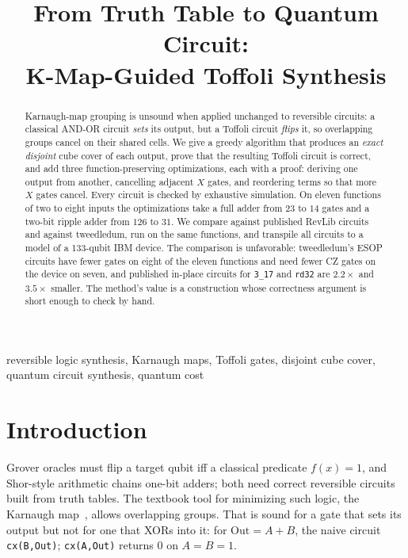 \documentclass[conference]{IEEEtran}
\newcommand{\code}[1]{\texttt{#1}}
\theoremstyle{plain}
\begin{document}
\title{From Truth Table to Quantum Circuit:\\K-Map-Guided Toffoli Synthesis}
\author{
}

\maketitle

\begin{abstract}
Karnaugh-map grouping is unsound when applied unchanged to reversible
circuits: a classical AND-OR circuit \emph{sets} its output, but a
Toffoli circuit \emph{flips} it, so overlapping groups cancel on their
shared cells. We give a greedy algorithm that produces an \emph{exact
disjoint} cube cover of each output, prove that the resulting Toffoli
circuit is correct, and add three function-preserving optimizations,
each with a proof: deriving one output from another, cancelling adjacent
$X$ gates, and reordering terms so that more $X$ gates cancel. Every
circuit is checked by exhaustive simulation. On eleven functions of two
to eight inputs the optimizations take a full adder from $23$ to $14$
gates and a two-bit ripple adder from $126$ to $31$. We compare against
published RevLib circuits and against tweedledum, run on the same
functions, and transpile all circuits to a model of a 133-qubit IBM
device. The comparison is unfavorable: tweedledum's ESOP circuits have
fewer gates on eight of the eleven functions and need fewer CZ gates on
the device on seven, and published in-place circuits for \texttt{3\_17}
and \texttt{rd32} are $2.2\times$ and $3.5\times$ smaller. The method's
value is a construction whose correctness argument is short enough to
check by hand.
\end{abstract}

\begin{IEEEkeywords}
reversible logic synthesis, Karnaugh maps, Toffoli gates, disjoint cube
cover, quantum circuit synthesis, quantum cost
\end{IEEEkeywords}

\section{Introduction}
Grover oracles must flip a target qubit iff a classical predicate
$f(x)=1$, and Shor-style arithmetic chains one-bit adders; both need
correct reversible circuits built from truth tables. The textbook tool
for minimizing such logic, the Karnaugh map~\cite{karnaugh1953}, allows
overlapping groups. That is sound for a gate that sets its output but
not for one that XORs into it: for $\mathrm{Out}=A+B$, the naive circuit
\code{cx(B,Out)}; \code{cx(A,Out)} returns $0$ on $A{=}B{=}1$.
\end{document}
